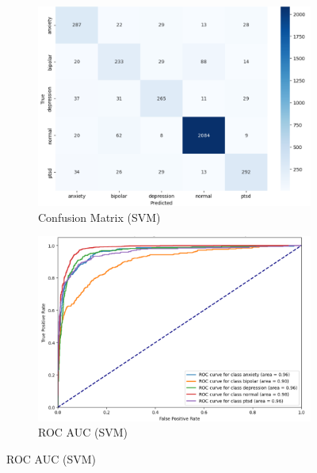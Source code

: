 \begin{figure}[h!]
    \centering
    \begin{subfigure}[b]{0.49\textwidth}
        \centering
        \includegraphics[width=\textwidth]{Images/SVM Confusion Matrix.png}
        \caption*{Confusion Matrix (SVM)}
        \label{SVMCM}  %
    \end{subfigure}
    \hfill
    \begin{subfigure}[b]{0.49\textwidth}
        \centering
        \includegraphics[width=\textwidth]{Images/SVM ROC.png}
        \caption*{ROC AUC (SVM)}
        \label{SVMROC}  %
    \end{subfigure}
    \label{fig:svm_comparison}
\end{figure}

